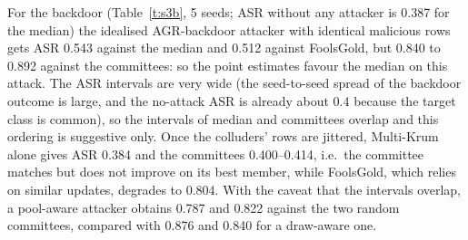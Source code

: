 \documentclass[conference]{IEEEtran}
\begin{document}
\begin{table}[t]\centering\caption{Test accuracy (mean$\pm$95\% half-width over 5 seeds), $K=20$, $f=4$ colluding omniscient attackers, i.i.d.\ clients. ``pool'' rows: attacker does not know the random draw; only randomised committees are listed there (for deterministic rules the two knowledge levels coincide).}\label{t:s3u}\scriptsize
{}\end{table}
For the backdoor (Table~\ref{t:s3b}, 5 seeds; ASR without any attacker is 0.387 for the median) the idealised AGR-backdoor attacker with identical malicious rows gets ASR 0.543 against the median and 0.512 against FoolsGold, but 0.840 to 0.892 against the committees: so the point estimates favour the median on this attack. The ASR intervals are very wide (the seed-to-seed spread of the backdoor outcome is large, and the no-attack ASR is already about 0.4 because the target class is common), so the intervals of median and committees overlap and this ordering is suggestive only. Once the colluders' rows are jittered, Multi-Krum alone gives ASR 0.384 and the committees 0.400--0.414, i.e.\ the committee matches but does not improve on its best member, while FoolsGold, which relies on similar updates, degrades to 0.804. With the caveat that the intervals overlap, a pool-aware attacker obtains 0.787 and 0.822 against the two random committees, compared with 0.876 and 0.840 for a draw-aware one.
\end{document}
